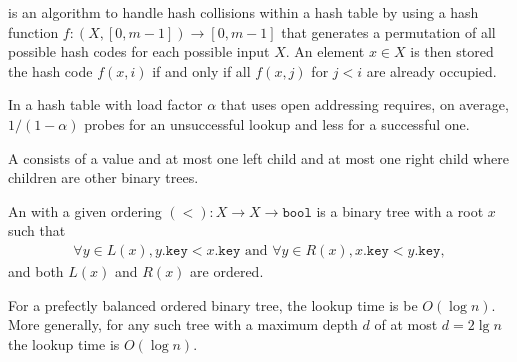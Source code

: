 \documentclass{article}
\begin{document}
\begin{definition}
	 is an algorithm to handle hash collisions within a hash table 
	by using a hash function $f: (X, [0,m-1]) \to [0,m-1]$ that generates a permutation of all possible
	hash codes for each possible input $X$. An element $x\in X$ is then stored the hash code $f(x, i)$
	if and only if all $f(x,j)$ for $j < i$ are already occupied.
\end{definition}
\begin{proposition}
	In a hash table with load factor $\alpha$ that uses open addressing requires, on average, $1/(1-\alpha)$ 
	probes for an unsuccessful lookup and less for a successful one.
\end{proposition}
\begin{definition}
	A  consists of a value and at most one left child and at most one right child where
	children are other binary trees.
\end{definition}
\begin{definition}
	An  with a given ordering $(<) : X \to X \to \texttt{bool}$ is a binary tree 
	with a root $x$ such that
	\begin{align*}
		\forall y \in L(x), y.\texttt{key} < x.\texttt{key} 
		\text{ and } \forall y \in R(x), x.\texttt{key} < y.\texttt{key},
	\end{align*}
	and both $L(x)$ and $R(x)$ are ordered.
\end{definition}
\begin{proposition}
	For a prefectly balanced ordered binary tree, the lookup time is be $O(\log n)$.\\
	More generally, for any such tree with a maximum depth $d$ of at most $d=2 \lg n$ the
	lookup time is $O(\log n)$.
\end{proposition}
\end{document}
